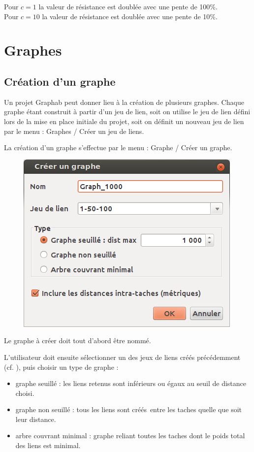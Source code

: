 \documentclass{article}
\begin{document}
Pour $c=1$ la valeur de résistance est doublée avec une pente de 100\%.\\
Pour $c=10$ la valeur de résistance est doublée avec une pente de 10\%.

\section{Graphes}

\subsection{Création d'un graphe}
Un projet Graphab peut donner lieu à la création de plusieurs graphes. Chaque graphe étant construit à partir d’un jeu de lien, soit on utilise le jeu de lien défini lors de la mise en place initiale du projet, soit on définit un nouveau jeu de lien par le menu : Graphes / Créer un jeu de liens.

La création d’un graphe s’effectue par le menu : Graphe / Créer un graphe. 

\begin{figure}[H]
	\includegraphics[scale=0.5]{img/manual-fr_img6.png} 
\end{figure}

Le graphe à créer doit tout d’abord être nommé.

L’utilisateur doit ensuite sélectionner un des jeux de liens créés précédemment (cf. ), puis choisir un type de graphe :
\begin{itemize}
	\item graphe seuillé : les liens retenus sont inférieurs ou égaux au seuil de distance choisi.
	\item graphe non seuillé : tous les liens sont créés~entre les taches quelle que soit leur distance.
	\item arbre couvrant minimal : graphe reliant toutes les taches dont le poids total des liens est minimal.
\end{itemize}
\end{document}
